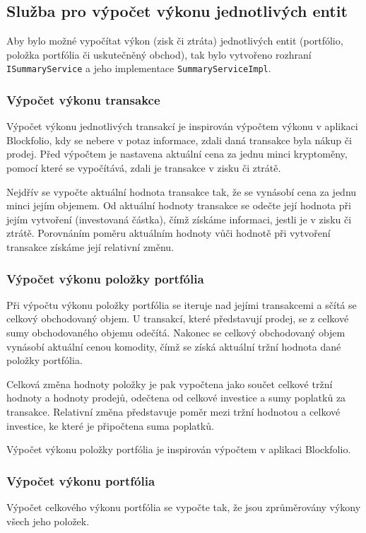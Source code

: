\documentclass[12pt, a4paper]{article}
\begin{document}
    \subsection{Služba pro výpočet výkonu jednotlivých entit}
    Aby bylo možné vypočítat výkon (zisk či ztráta) jednotlivých entit (portfólio, položka portfólia či uskutečněný obchod), tak bylo vytvořeno rozhraní \texttt{ISummaryService} a jeho implementace \texttt{SummaryServiceImpl}.
    
    \subsubsection{Výpočet výkonu transakce}
    Výpočet výkonu jednotlivých transakcí je inspirován výpočtem výkonu v aplikaci Blockfolio, kdy se nebere v potaz informace, zdali daná transakce byla nákup či prodej.
    Před výpočtem je nastavena aktuální cena za jednu minci kryptoměny, pomocí které se vypočítává, zdali je transakce v zisku či ztrátě.
    
    Nejdřív se vypočte aktuální hodnota transakce tak, že se vynásobí cena za jednu minci jejím objemem.
    Od aktuální hodnoty transakce se odečte její hodnota při jejím vytvoření (investovaná částka), čímž získáme informaci, jestli je v zisku či ztrátě.
    Porovnáním poměru aktuálním hodnoty vůči hodnotě při vytvoření transakce získáme její relativní změnu.
    
    \subsubsection{Výpočet výkonu položky portfólia}
    Při výpočtu výkonu položky portfólia se iteruje nad jejími transakcemi a sčítá se celkový obchodovaný objem.
    U transakcí, které představují prodej, se z celkové sumy obchodovaného objemu odečítá.
    Nakonec se celkový obchodovaný objem vynásobí aktuální cenou komodity, čímž se získá aktuální tržní hodnota dané položky portfólia.
    
    Celková změna hodnoty položky je pak vypočtena jako součet celkové tržní hodnoty a hodnoty prodejů, odečtena od celkové investice a sumy poplatků za transakce. 
    Relativní změna představuje poměr mezi tržní hodnotou a celkové investice, ke které je připočtena suma poplatků.
    
    Výpočet výkonu položky portfólia je inspirován výpočtem v aplikaci Blockfolio.
    
    \subsubsection{Výpočet výkonu portfólia}
    Výpočet celkového výkonu portfólia se vypočte tak, že jsou zprůměrovány výkony všech jeho položek.
    
\end{document}
